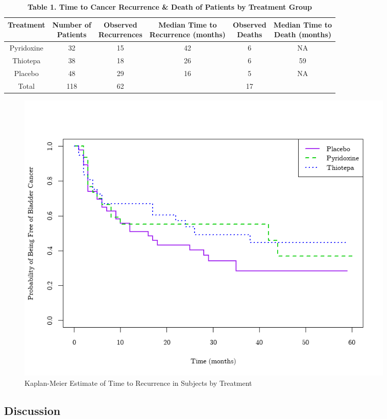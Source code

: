 \documentclass{article}
\begin{document}
	\begin{table}[ht]
		\centering
		\footnotesize
		\caption*{\textbf{Table 1. Time to Cancer Recurrence \& Death of Patients by Treatment Group}}
		\begin{tabular}{@{}c c | c c | c c@{}}
			\toprule
			Treatment & \parbox[t]{2cm}{Number of\\ Patients} & \parbox[t]{2.5cm}{Observed\\ Recurrences} & \parbox[t]{3cm}{Median Time to\\ Recurrence (months)} & \parbox[t]{2.5cm}{Observed\\ Deaths} & \parbox[t]{3cm}{Median Time to\\ Death (months)} \\
			\midrule
			Pyridoxine & 32 & 15 & 42 & 6 & NA \\
			Thiotepa   & 38 & 18 & 26 & 6 & 59 \\
			Placebo    & 48 & 29 & 16 & 5 & NA \\
			\midrule
			Total      & 118 & 62 & & 17 & \\
			\bottomrule
		\end{tabular}
	\end{table}

	\begin{figure}[h!]
		\centering
		\tiny
		  \centering
		  \tiny
		  \includegraphics[width=0.9\textwidth]{graphs/case1/recurrance~treatment_all.png}
		  \caption{Kaplan-Meier Estimate of Time to Recurrence in Subjects by Treatment}
		  \label{recur~treat_all}
	\end{figure}

	\subsection*{Discussion}
		
\end{document}
